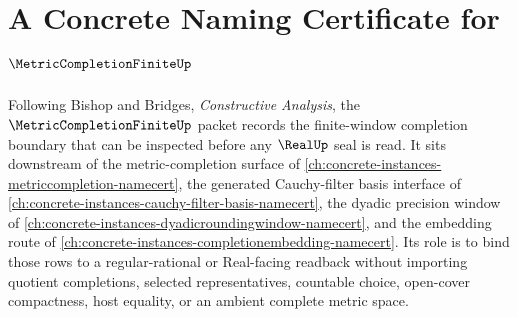 \chapter{A Concrete Naming Certificate for $\MetricCompletionFiniteUp$}
\label{ch:concrete-instances-metriccompletionfinite-namecert}

Following Bishop and Bridges, \emph{Constructive Analysis}, the $\MetricCompletionFiniteUp$ packet records the finite-window completion boundary that can be inspected before any $\RealUp$ seal is read. It sits downstream of the metric-completion surface of \autoref{ch:concrete-instances-metriccompletion-namecert}, the generated Cauchy-filter basis interface of \autoref{ch:concrete-instances-cauchy-filter-basis-namecert}, the dyadic precision window of \autoref{ch:concrete-instances-dyadicroundingwindow-namecert}, and the embedding route of \autoref{ch:concrete-instances-completionembedding-namecert}. Its role is to bind those rows to a regular-rational or Real-facing readback without importing quotient completions, selected representatives, countable choice, open-cover compactness, host equality, or an ambient complete metric space.

